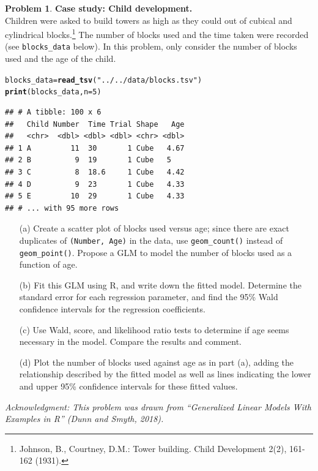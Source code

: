 \documentclass[11pt,letterpaper,english,oneside]{article}\usepackage[]{graphicx}\usepackage[]{color}
\makeatletter
\newcommand{\hlnum}[1]{\textcolor[rgb]{0.686,0.059,0.569}{#1}}%
\newcommand{\hlstr}[1]{\textcolor[rgb]{0.192,0.494,0.8}{#1}}%
\newcommand{\hlstd}[1]{\textcolor[rgb]{0.345,0.345,0.345}{#1}}%
\newcommand{\hlkwb}[1]{\textcolor[rgb]{0.69,0.353,0.396}{#1}}%
\newcommand{\hlkwc}[1]{\textcolor[rgb]{0.333,0.667,0.333}{#1}}%
\newcommand{\hlkwd}[1]{\textcolor[rgb]{0.737,0.353,0.396}{\textbf{#1}}}%
\newenvironment{kframe}{%
 \def\at@end@of@kframe{}%
 \ifinner\ifhmode%
  \def\at@end@of@kframe{\end{minipage}}%
  \begin{minipage}{\columnwidth}%
 \fi\fi%
 \def\FrameCommand##1{\hskip\@totalleftmargin \hskip-\fboxsep
 \colorbox{shadecolor}{##1}\hskip-\fboxsep
     \hskip-\linewidth \hskip-\@totalleftmargin \hskip\columnwidth}%
 \MakeFramed {\advance\hsize-\width
   \@totalleftmargin\z@ \linewidth\hsize
   \@setminipage}}%
 {\par\unskip\endMakeFramed%
 \at@end@of@kframe}
\newenvironment{knitrout}{}{} %
\theoremstyle{definition} %
\newtheorem{problem}{Problem}
\newenvironment{prob}{\clearpage \begin{problem}\hspace{0pt}}{\end{problem}}
\makeatother
\begin{document}
\begin{prob} \label{prob:blocks-data}\textbf{Case study: Child development.} \\

\noindent Children were asked to build towers as high as they could out of cubical and cylindrical blocks.\footnote{Johnson, B., Courtney, D.M.: Tower building. Child Development 2(2), 161-162 (1931).} The number of blocks used and the time taken were recorded (see \verb|blocks_data| below). In this problem, only consider the number of blocks used and the age of the child.
\begin{knitrout}
\color{fgcolor}\begin{kframe}
\begin{alltt}
\hlstd{blocks_data} \hlkwb{=} \hlkwd{read_tsv}\hlstd{(}\hlstr{"../../data/blocks.tsv"}\hlstd{)}
\hlkwd{print}\hlstd{(blocks_data,} \hlkwc{n} \hlstd{=} \hlnum{5}\hlstd{)}
\end{alltt}
\begin{verbatim}
## # A tibble: 100 x 6
##   Child Number  Time Trial Shape   Age
##   <chr>  <dbl> <dbl> <dbl> <chr> <dbl>
## 1 A         11  30       1 Cube   4.67
## 2 B          9  19       1 Cube   5   
## 3 C          8  18.6     1 Cube   4.42
## 4 D          9  23       1 Cube   4.33
## 5 E         10  29       1 Cube   4.33
## # ... with 95 more rows
\end{verbatim}
\end{kframe}
\end{knitrout}

\begin{enumerate}

\item[(a)] Create a scatter plot of blocks used versus age; since there are exact duplicates of \verb|(Number, Age)| in the data, use \verb|geom_count()| instead of \verb|geom_point()|. Propose a GLM to model the number of blocks used as a function of age.

\item[(b)] Fit this GLM using R, and write down the fitted model. Determine the standard error for each regression parameter, and find the 95\% Wald confidence intervals for the regression coefficients.

\item[(c)] Use Wald, score, and likelihood ratio tests to determine if age seems necessary in the model. Compare the results and comment.

\item[(d)] Plot the number of blocks used against age as in part (a), adding the relationship described by the fitted model as well as lines indicating the lower and upper 95\% confidence intervals for these fitted values.

\end{enumerate}

\noindent \textit{Acknowledgment: This problem was drawn from ``Generalized Linear Models With Examples in R'' (Dunn and Smyth, 2018).}


\end{prob}
\end{document}
